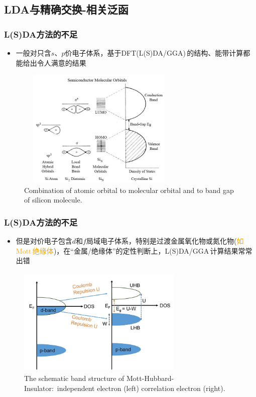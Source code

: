 {\subsection{\rm{LDA}与精确交换-相关泛函}
\frame
{
	\frametitle{\textrm{L(S)DA}方法的不足}
	\begin{itemize}
		\item 一般对只含$s$、$p$价电子体系，基于\textrm{DFT(L(S)DA/GGA)\,}的结构、能带计算都能给出令人满意的结果
	\end{itemize}
\begin{figure}[h!]
\centering
\vspace*{-0.25in}
\includegraphics[height=2.25in,width=3.1in,viewport=0 0 630 560,clip]{Figures/Combination-of-atomic-orbital-to-molecular-orbital-and-to-band-gap-of-silicon-molecule.png}
\caption{\tiny \textrm{Combination of atomic orbital to molecular orbital and to band gap of silicon molecule.}}%
\label{LDA_U-1}
\end{figure}
}

\frame
{
	\frametitle{\textrm{L(S)DA}方法的不足}
	\begin{itemize}
		\item 但是对价电子包含$d$和$f$局域电子体系，特别是过渡金属氧化物或氮化物(\textcolor{orange}{如\textrm{Mott}\,绝缘体})，在“金属/绝缘体”的定性判断上，\textrm{L(S)DA/GGA}\,计算结果常常出错
	\end{itemize}
\begin{figure}[h!]
\centering
\vspace*{-0.20in}
\includegraphics[height=2.05in,width=3.1in,viewport=0 0 205 140,clip]{Figures/Band-diagram-of-Mott-Hubbard-Insulator.jpg}
\caption{\tiny \textrm{The schematic band structure of Mott-Hubbard-Insulator:~independent electron (left) correlation electron (right).}}%
\label{LDA_U-3}
\end{figure}
}

}
